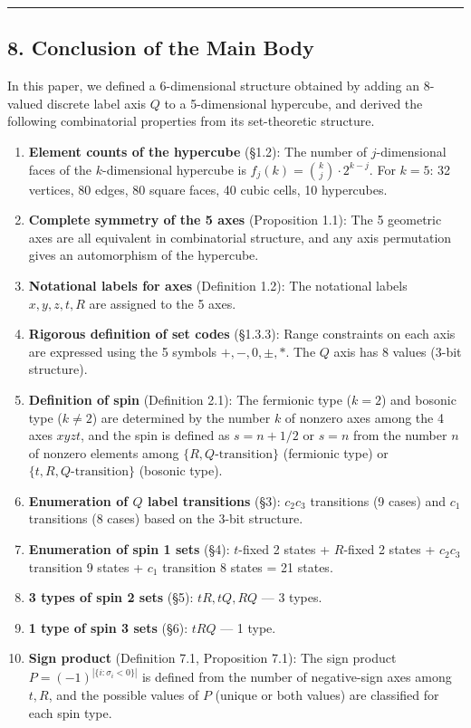 \documentclass[
  a4paper,11pt]{article}
\providecommand{\tightlist}{%
  \setlength{\itemsep}{0pt}\setlength{\parskip}{0pt}}
\theoremstyle{definition}
\theoremstyle{remark}
\begin{document}
\begin{center}\rule{0.5\linewidth}{0.5pt}\end{center}

\subsection{8. Conclusion of the Main
Body}\label{conclusion-of-the-main-body}

In this paper, we defined a 6-dimensional structure obtained by adding
an 8-valued discrete label axis \(Q\) to a 5-dimensional hypercube, and
derived the following combinatorial properties from its set-theoretic
structure.

\begin{enumerate}
\def\labelenumi{\arabic{enumi}.}
\tightlist
\item
  \textbf{Element counts of the hypercube} (§1.2): The number of
  \(j\)-dimensional faces of the \(k\)-dimensional hypercube is
  \(f_j(k) = \binom{k}{j} \cdot 2^{k-j}\). For \(k = 5\): 32 vertices,
  80 edges, 80 square faces, 40 cubic cells, 10 hypercubes.
\item
  \textbf{Complete symmetry of the 5 axes} (Proposition 1.1): The 5
  geometric axes are all equivalent in combinatorial structure, and any
  axis permutation gives an automorphism of the hypercube.
\item
  \textbf{Notational labels for axes} (Definition 1.2): The notational
  labels \(x, y, z, t, R\) are assigned to the 5 axes.
\item
  \textbf{Rigorous definition of set codes} (§1.3.3): Range constraints
  on each axis are expressed using the 5 symbols \(+, -, 0, \pm, *\).
  The \(Q\) axis has 8 values (3-bit structure).
\item
  \textbf{Definition of spin} (Definition 2.1): The fermionic type
  (\(k = 2\)) and bosonic type (\(k \neq 2\)) are determined by the
  number \(k\) of nonzero axes among the 4 axes \(xyzt\), and the spin
  is defined as \(s = n + 1/2\) or \(s = n\) from the number \(n\) of
  nonzero elements among \(\{R, Q\text{-transition}\}\) (fermionic type)
  or \(\{t, R, Q\text{-transition}\}\) (bosonic type).
\item
  \textbf{Enumeration of \(Q\) label transitions} (§3): \(c_2 c_3\)
  transitions (9 cases) and \(c_1\) transitions (8 cases) based on the
  3-bit structure.
\item
  \textbf{Enumeration of spin 1 sets} (§4): \(t\)-fixed 2 states +
  \(R\)-fixed 2 states + \(c_2 c_3\) transition 9 states + \(c_1\)
  transition 8 states = 21 states.
\item
  \textbf{3 types of spin 2 sets} (§5): \(tR, tQ, RQ\) --- 3 types.
\item
  \textbf{1 type of spin 3 sets} (§6): \(tRQ\) --- 1 type.
\item
  \textbf{Sign product} (Definition 7.1, Proposition 7.1): The sign
  product \(P = (-1)^{|\{i : \sigma_i < 0\}|}\) is defined from the
  number of negative-sign axes among \(t, R\), and the possible values
  of \(P\) (unique or both values) are classified for each spin type.
\end{enumerate}
\end{document}
